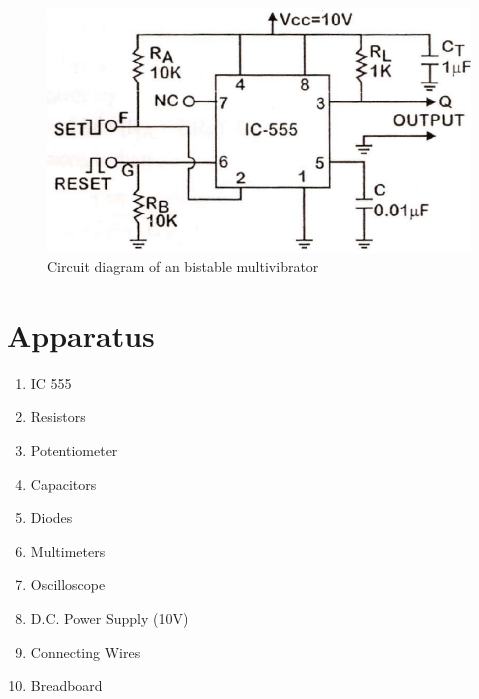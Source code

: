 \begin{figure}[H]
    \centering
    \includegraphics[width=0.8\columnwidth]{images/bis2.png}
    \caption{Circuit diagram of an bistable multivibrator}
    \label{bis2}
\end{figure}

\section{Apparatus}

\begin{enumerate}
    \item IC 555
    \item Resistors
    \item Potentiometer
    \item Capacitors
    \item Diodes
    \item Multimeters
    \item Oscilloscope
    \item D.C. Power Supply (10V)
    \item Connecting Wires
    \item Breadboard
\end{enumerate}